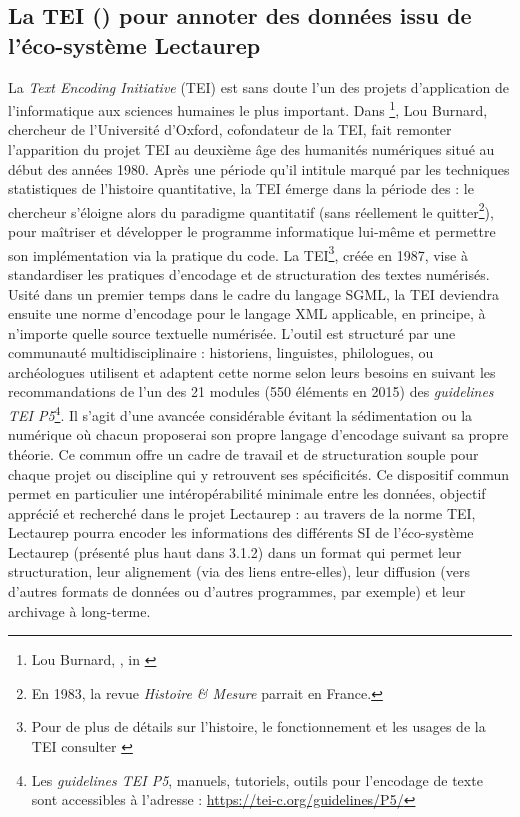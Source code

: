 \subsection{La TEI () pour annoter des données issu de l'éco-système Lectaurep}

La \textit{Text Encoding Initiative} (TEI) est sans doute l'un des projets d'application de l'informatique aux sciences humaines le plus important. Dans \footnote{Lou Burnard, , in \cite{mounier_dir_readwrite_2012}}, Lou Burnard, chercheur de l'Université d'Oxford, cofondateur de la TEI, fait remonter l'apparition du projet TEI au deuxième âge des humanités numériques situé au début des années 1980.  Après une période qu'il intitule  marqué par les techniques statistiques de l'histoire quantitative, la TEI émerge dans la période des  : le chercheur s'éloigne alors du paradigme quantitatif (sans réellement le quitter\footnote{En 1983, la revue \textit{Histoire \& Mesure} parrait en France.}), pour maîtriser et développer le programme informatique lui-même et permettre son implémentation via la pratique du code. 
La TEI\footnote{Pour de plus de détails sur l'histoire, le fonctionnement et les usages de la TEI consulter \cite{burnard_quest-ce_2015}}, créée en 1987, vise à standardiser les pratiques d'encodage et de structuration des textes numérisés. Usité dans un premier temps dans le cadre du langage SGML, la TEI deviendra ensuite une norme d'encodage pour le langage XML applicable, en principe, à n'importe quelle source textuelle numérisée. L'outil est structuré par une communauté multidisciplinaire : historiens, linguistes, philologues, ou archéologues utilisent et adaptent cette norme selon leurs besoins en suivant les recommandations de l'un des 21 modules (550 éléments en 2015) des \textit{guidelines TEI P5}\footnote{Les \textit{guidelines TEI P5}, manuels, tutoriels, outils pour l'encodage de texte sont accessibles à l'adresse : \url{https://tei-c.org/guidelines/P5/}}. 
Il s'agit d'une avancée considérable évitant la sédimentation ou la  numérique où chacun proposerai son propre langage d'encodage suivant sa propre théorie. Ce  commun offre un cadre de travail et de structuration souple pour chaque projet ou discipline qui y retrouvent ses spécificités. Ce dispositif commun permet en particulier une intéropérabilité minimale entre les données, objectif apprécié et recherché dans le projet Lectaurep : au travers de la norme TEI, Lectaurep pourra encoder les informations des différents SI de l'éco-système Lectaurep (présenté plus haut dans 3.1.2) dans un format qui permet leur structuration, leur alignement (via des liens entre-elles), leur diffusion (vers d'autres formats de données ou d'autres programmes, par exemple) et leur archivage à long-terme. 


